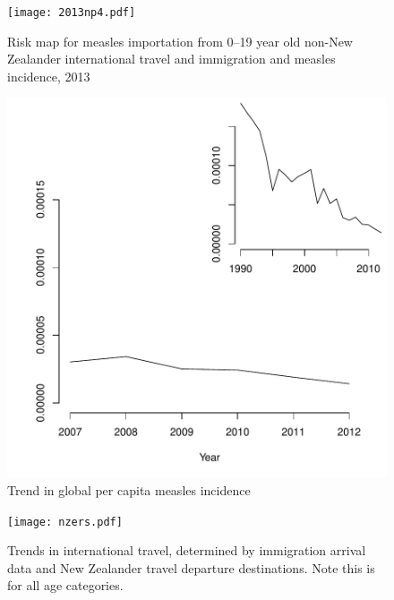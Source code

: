 \documentclass{article}
\begin{document}
\begin{figure}
\begin{center}
     \texttt{[image: 2013np4.pdf]}
\end{center}
\caption{Risk map for measles importation from 0--19 year old non-New Zealander international travel and immigration and measles incidence, 2013}
\label{fig:imrisk12}
\end{figure}

\begin{figure}
\begin{center}
\includegraphics{draftfinalreport_v3-032}
\end{center}
\caption{Trend in global per capita measles incidence}
\label{fig:trendincidence}
\end{figure}

\begin{figure}[H]
     \begin{center}
     \texttt{[image: nzers.pdf]}
     \end{center}
     \caption{Trends in international travel, determined by immigration arrival data and New Zealander travel departure destinations. Note this is for all age categories.}
     \label{fig:travel}
\end{figure}
\end{document}
